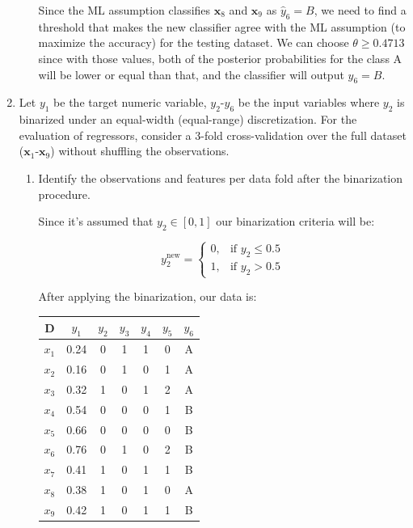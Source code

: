 \documentclass[12pt]{article}
\begin{document}
\begin{enumerate}[leftmargin=\labelsep]
\begin{enumerate}
            Since the ML assumption classifies $\mathbf{x}_8$ and $\mathbf{x}_9$ as $\hat{y}_6 = B$, we need to find a threshold that makes the new classifier agree with the ML assumption (to maximize the accuracy) for the testing dataset.
            We can choose $\theta \geq 0.4713$ since with those values, both of the posterior probabilities for the class A will be lower or equal than that, and the classifier will output $\hat{y}_6 = B$.

    \end{enumerate}

    \item Let $y_1$ be the target numeric variable, $y_2$-$y_6$ be the input variables where $y_2$ is binarized under an
    equal-width (equal-range) discretization. For the evaluation of regressors, consider a 3-fold
    cross-validation over the full dataset ($\mathbf{x}_1$-$\mathbf{x}_9$) without shuffling the observations.

    \begin{enumerate}
        \item Identify the observations and features per data fold after the binarization procedure.
        
        Since it's assumed that $y_2 \in [0, 1]$ our binarization criteria will be:

        \[ 
            y_2^{\textrm{new}} = \left\{
            \begin{array}{ll}
                  0, & \textrm{if } y_2 \leq 0.5 \\
                  1, & \textrm{if } y_2 > 0.5
            \end{array} 
            \right. 
        \]

        After applying the binarization, our data is:

        \begin{center}
        \begin{tabular}{|c|c|c|c|c|c|c|}
        \hline
        D     & $y_1$ & $y_2$ & $y_3$ & $y_4$ & $y_5$ & $y_6$ \\
        \hline
        $x_1$ & 0.24  & 0     & 1     & 1     & 0     & A \\
        $x_2$ & 0.16  & 0     & 1     & 0     & 1     & A \\
        $x_3$ & 0.32  & 1     & 0     & 1     & 2     & A \\
        $x_4$ & 0.54  & 0     & 0     & 0     & 1     & B \\
        $x_5$ & 0.66  & 0     & 0     & 0     & 0     & B \\
        $x_6$ & 0.76  & 0     & 1     & 0     & 2     & B \\
        $x_7$ & 0.41  & 1     & 0     & 1     & 1     & B \\
        $x_8$ & 0.38  & 1     & 0     & 1     & 0     & A \\
        $x_9$ & 0.42  & 1     & 0     & 1     & 1     & B \\
        \hline
        \end{tabular}
        \end{center}


\end{enumerate}
\end{enumerate}
\end{document}
